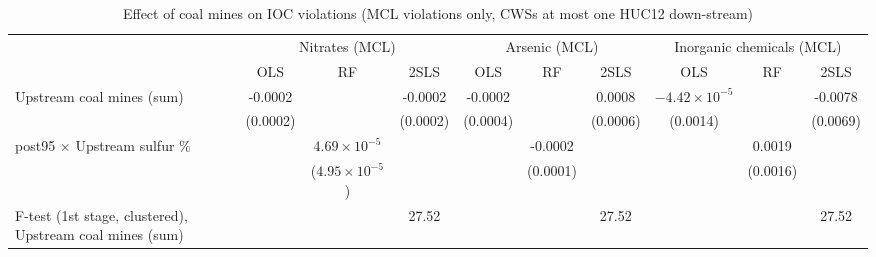 
\begin{table}[htbp]
   
   \caption{\label{2sls_dwnstrm_minevio_mcl_ivsum_binvio} Effect of coal mines on IOC violations (MCL violations only, CWSs at most one HUC12 down-stream)}
   \bigskip
   
   \centering
   
   \begin{adjustbox}{width = \textwidth, center}
      
      
      \begin{tabular}{lccccccccc}
         \toprule
         
          & \multicolumn{3}{c}{Nitrates (MCL)} & \multicolumn{3}{c}{Arsenic (MCL)} & \multicolumn{3}{c}{Inorganic chemicals (MCL)}\\
         
                                                                  & OLS           & RF                      & 2SLS          & OLS           & RF            & 2SLS          & OLS                    & RF            & 2SLS\\  
         
         \midrule 
         Upstream coal mines (sum)                                & -0.0002       &                         & -0.0002       & -0.0002       &               & 0.0008        & $-4.42\times 10^{-5}$  &               & -0.0078\\   
                                                                  & (0.0002)      &                         & (0.0002)      & (0.0004)      &               & (0.0006)      & (0.0014)               &               & (0.0069)\\   
         post95 $\times$ Upstream sulfur \%                       &               & $4.69\times 10^{-5}$    &               &               & -0.0002       &               &                        & 0.0019        &   \\   
                                                                  &               & ($4.95\times 10^{-5}$)  &               &               & (0.0001)      &               &                        & (0.0016)      &   \\   
         
         F-test (1st stage, clustered), Upstream coal mines (sum) &               &                         & 27.52         &               &               & 27.52         &                        &               & 27.52\\  
         

\end{tabular}
\end{adjustbox}
\end{table}
